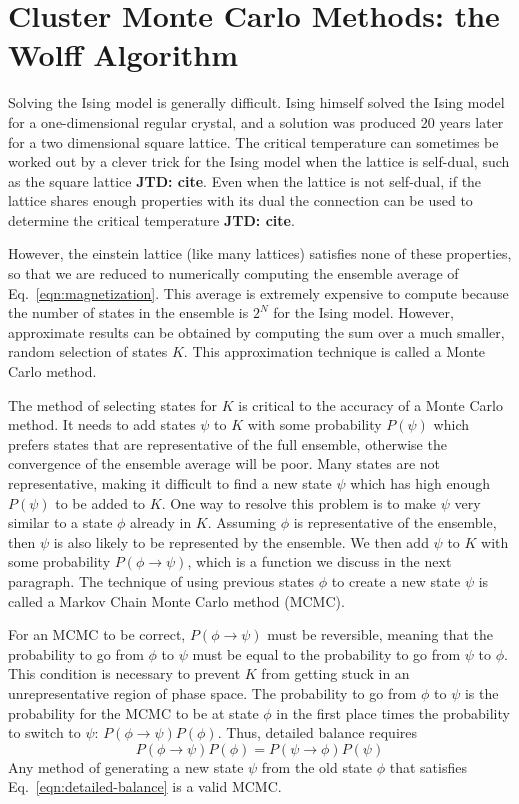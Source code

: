 \documentclass[amsmath,amssymb,aps,twocolumn,nofootinbib]{revtex4-2}
\newcommand{\jtd}[1]{{\color{red}\textbf{JTD: #1}}}
\begin{document}
\section{Cluster Monte Carlo Methods: the Wolff Algorithm}
Solving the Ising model is generally difficult. Ising himself solved the Ising model for a one-dimensional regular crystal, and a solution was produced 20 years later for a two dimensional square lattice. The critical temperature can sometimes be worked out by a clever trick for the Ising model when the lattice is self-dual, such as the square lattice \jtd{cite}. Even when the lattice is not self-dual, if the lattice shares enough properties with its dual the connection can be used to determine the critical temperature \jtd{cite}.

However, the einstein lattice (like many lattices) satisfies none of these properties, so that we are reduced to numerically computing the ensemble average of Eq.~\ref{eqn:magnetization}. This average is extremely expensive to compute because the number of states in the ensemble is $2^N$ for the Ising model. However, approximate results can be obtained by computing the sum over a much smaller, random selection of states $K$. This approximation technique is called a Monte Carlo method.

The method of selecting states for $K$ is critical to the accuracy of a Monte Carlo method. It needs to add states $\psi$ to $K$ with some probability $P(\psi)$ which prefers states that are representative of the full ensemble, otherwise the convergence of the ensemble average will be poor. Many states are not representative, making it difficult to find a new state $\psi$ which has high enough $P(\psi)$ to be added to $K$. One way to resolve this problem is to make $\psi$ very similar to a state $\phi$ already in $K$. Assuming $\phi$ is representative of the ensemble, then $\psi$ is also likely to be represented by the ensemble. We then add $\psi$ to $K$ with some probability $P(\phi \rightarrow \psi)$, which is a function we discuss in the next paragraph. The technique of using previous states $\phi$ to create a new state $\psi$ is called a Markov Chain Monte Carlo method (MCMC).

For an MCMC to be correct, $P(\phi \rightarrow \psi)$ must be reversible, meaning that the probability to go from $\phi$ to $\psi$ must be equal to the probability to go from $\psi$ to $\phi$. This condition is necessary to prevent $K$ from getting stuck in an unrepresentative region of phase space. The probability to go from $\phi$ to $\psi$ is the probability for the MCMC to be at state $\phi$ in the first place times the probability to switch to $\psi$: $P(\phi \rightarrow \psi)P(\phi)$. Thus, detailed balance requires
\begin{equation}
  P(\phi \rightarrow \psi)P(\phi) = P(\psi \rightarrow \phi)P(\psi)
  \label{eqn:detailed-balance}
\end{equation}
Any method of generating a new state $\psi$ from the old state $\phi$ that satisfies Eq.~\ref{eqn:detailed-balance} is a valid MCMC.
\end{document}
